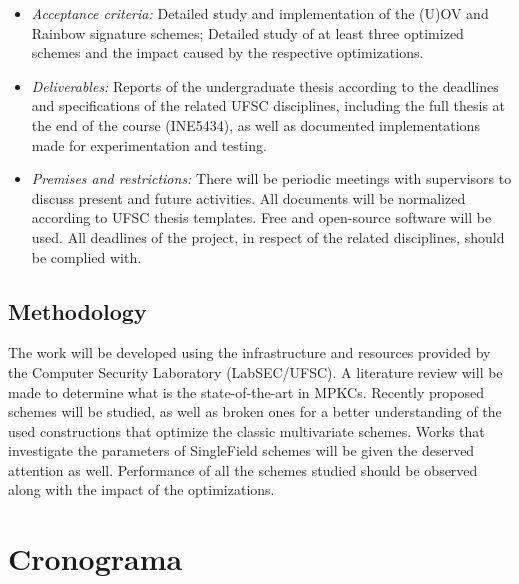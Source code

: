 \documentclass{ufsctex/ufsctex}
\begin{document}
\begin{itemize}
    \item \textit{Acceptance criteria:} Detailed study and implementation of
    the (U)OV and Rainbow signature schemes; Detailed study of at least three
    optimized schemes and the impact caused by the respective optimizations.

    \item \textit{Deliverables:} Reports of the undergraduate thesis according
    to the deadlines and specifications of the related UFSC disciplines,
    including the full thesis at the end of the course (INE5434), as well as
    documented implementations made for experimentation and testing.

    \item \textit{Premises and restrictions:} There will be periodic meetings
    with supervisors to discuss present and future activities. All documents
    will be normalized according to UFSC thesis templates. Free and open-source
    software will be used. All deadlines of the project, in respect of the
    related disciplines, should be complied with.

\end{itemize}

\section{Methodology}

The work will be developed using the infrastructure and resources provided by
the Computer Security Laboratory (LabSEC/UFSC). A literature review will be
made to determine what is the state-of-the-art in MPKCs. Recently proposed
schemes will be studied, as well as broken ones for a better understanding of
the used constructions that optimize the classic multivariate schemes. Works
that investigate the parameters of SingleField schemes will be given the
deserved attention as well. Performance of all the schemes studied should be
observed along with the impact of the optimizations.

\chapter{Cronograma}
\end{document}
